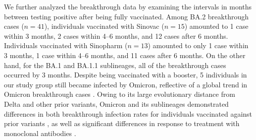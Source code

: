 
We further analyzed the breakthrough data by examining the intervals in months between testing positive after being fully vaccinated.
Among BA.2 breakthrough cases ($n=41$), individuals vaccinated with Sinovac ($n=15$) amounted to 1 case within 3 months, 2 cases within 4--6 months, and 12 cases after 6 months.
Individuals vaccinated with Sinopharm ($n=13$) amounted to only 1 case within 3 months, 1 case within 4--6 months, and 11 cases after 6 months.
On the other hand, for the BA.1 and BA.1.1 sublineages, all of the breakthrough cases occurred by 3 months.
Despite being vaccinated with a booster, 5 individuals in our study group still became infected by Omicron, reflective of a global trend in Omicron breakthrough cases \citep{goga2022breakthrough}.
Owing to its large evolutionary distance from Delta and other prior variants, Omicron and its sublineages demonstrated differences in both breakthrough infection rates for individuals vaccinated against prior variants \citep{safdar2023waning}, as well as significant differences in response to treatment with monoclonal antibodies \citep{bruel2022serum}.

